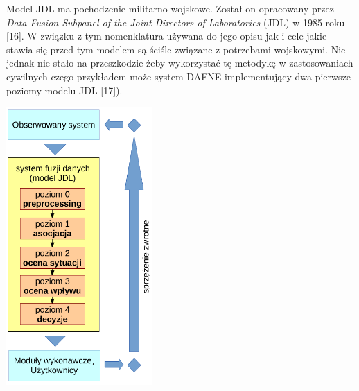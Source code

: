 \par{
Model JDL ma pochodzenie militarno-wojskowe. Został on opracowany przez \textit{Data Fusion Subpanel of the Joint Directors of Laboratories} (JDL) w 1985 roku [16]. W związku z tym nomenklatura używana do jego opisu jak i cele jakie stawia się przed tym modelem są ściśle związane z potrzebami wojskowymi. Nic jednak nie stało na przeszkodzie żeby wykorzystać tę metodykę w zastosowaniach cywilnych czego przykładem może system DAFNE implementujący dwa pierwsze poziomy modelu JDL [17]).
}
\par{
\begin{center}
\includegraphics[width=15em,keepaspectratio]{img/jdl}
\end{center}
}
